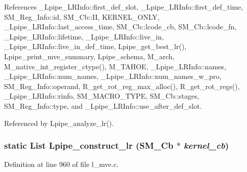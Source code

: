 References \_\-Lpipe\_\-LRInfo::first\_\-def\_\-slot, \_\-Lpipe\_\-LRInfo::first\_\-def\_\-time, SM\_\-Reg\_\-Info::id, SM\_\-Cb::II, KERNEL\_\-ONLY, \_\-Lpipe\_\-LRInfo::last\_\-access\_\-time, SM\_\-Cb::lcode\_\-cb, SM\_\-Cb::lcode\_\-fn, \_\-Lpipe\_\-LRInfo::lifetime, \_\-Lpipe\_\-LRInfo::live\_\-in, \_\-Lpipe\_\-LRInfo::live\_\-in\_\-def\_\-time, Lpipe\_\-get\_\-best\_\-lr(), Lpipe\_\-print\_\-mve\_\-summary, Lpipe\_\-schema, M\_\-arch, M\_\-native\_\-int\_\-register\_\-ctype(), M\_\-TAHOE, \_\-Lpipe\_\-LRInfo::names, \_\-Lpipe\_\-LRInfo::num\_\-names, \_\-Lpipe\_\-LRInfo::num\_\-names\_\-w\_\-pro, SM\_\-Reg\_\-Info::operand, R\_\-get\_\-rot\_\-reg\_\-max\_\-alloc(), R\_\-get\_\-rot\_\-regs(), \_\-Lpipe\_\-LRInfo::rinfo, SM\_\-MACRO\_\-TYPE, SM\_\-Cb::stages, SM\_\-Reg\_\-Info::type, and \_\-Lpipe\_\-LRInfo::use\_\-after\_\-def\_\-slot.

Referenced by Lpipe\_\-analyze\_\-lr().
\subsubsection{\setlength{\rightskip}{0pt plus 5cm}static List Lpipe\_\-construct\_\-lr (\bf{SM\_\-Cb} $\ast$ {\em kernel\_\-cb})\hspace{0.3cm}{\tt  [static]}}\label{l__mve_8c_e3f004767b57ec9efce4fbd01338344d}




Definition at line 960 of file l\_\-mve.c.

